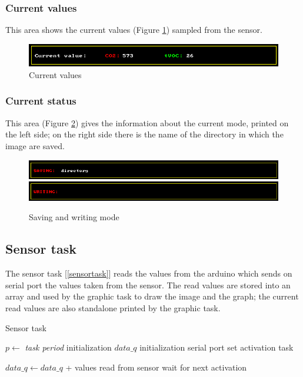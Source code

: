 \documentclass[12pt]{article}
\begin{document}
\subsubsection*{Current values}
This area shows the current values (Figure \ref{values}) sampled from the sensor.

\begin{figure}[H]
    \centering
    \includegraphics[scale=0.75]{images/values.png}
    \caption{Current values}
    \label{values}
\end{figure}

\subsubsection*{Current status}
This area (Figure \ref{save_write}) gives the information about the current
mode, printed on the left side; on the right side there is the name of the
directory in which the image are saved.

\begin{figure}[h]
    \centering
    \includegraphics[scale=0.75]{images/saving.png}
    \includegraphics[scale=0.75]{images/writing.png}
    \caption{Saving and writing mode}
    \label{save_write}
\end{figure}

\subsection{Sensor task}
The sensor task [\ref{sensortask}] reads the values from the arduino which
sends on serial port the values taken from the sensor. The read values are
stored into an array and used by the graphic task to draw the image and the
graph; the current read values are also standalone printed by the graphic
task.

\begin{algorithm}[H]
\caption{Sensor task}
\label{sensortask}

\begin{algorithmic}
\State $p\gets$ \textit{task period}
\State initialization $data\_q$
\State initialization serial port
\State set activation task

\Loop
\State $data\_q\gets data\_q$ + values read from sensor
\State wait for next activation
\EndLoop

\end{algorithmic}
\end{algorithm}
\end{document}
